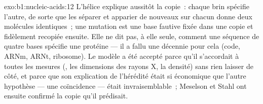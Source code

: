 \begin{solution}{exo:b1:nucleic-acids:12}
L'hélice explique aussitôt la copie~: chaque brin spécifie l'autre, de
sorte que les séparer et apparier de nouveaux  sur chacun
donne deux molécules identiques~; une mutation est une base fautive
fixée dans une copie et fidèlement recopiée ensuite. Elle ne dit pas, à
elle seule, comment une séquence de quatre bases spécifie une protéine
--- il a fallu une décennie pour cela (code, ARNm, ARNt, ribosome). Le
modèle a été accepté parce qu'il s'accordait à toutes les mesures
(, les dimensions des rayons X, la densité) sans rien laisser de
côté, et parce que son explication de l'hérédité était si économique que
l'autre hypothèse --- une coïncidence --- était invraisemblable~;
Meselson et Stahl ont ensuite confirmé la copie qu'il prédisait.
\end{solution}

